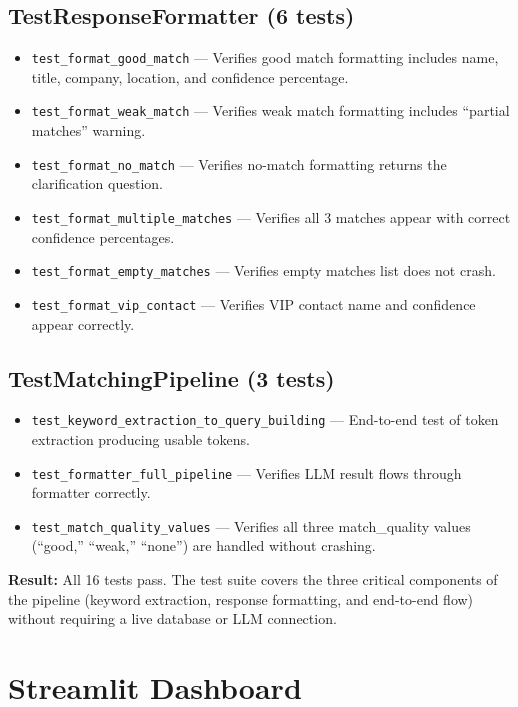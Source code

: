 \documentclass[12pt, a4paper]{report}
\begin{document}
\subsection{TestResponseFormatter (6 tests)}

\begin{itemize}[itemsep=2pt]
    \item \texttt{test\_format\_good\_match} --- Verifies good match formatting includes name, title, company, location, and confidence percentage.
    \item \texttt{test\_format\_weak\_match} --- Verifies weak match formatting includes ``partial matches'' warning.
    \item \texttt{test\_format\_no\_match} --- Verifies no-match formatting returns the clarification question.
    \item \texttt{test\_format\_multiple\_matches} --- Verifies all 3 matches appear with correct confidence percentages.
    \item \texttt{test\_format\_empty\_matches} --- Verifies empty matches list does not crash.
    \item \texttt{test\_format\_vip\_contact} --- Verifies VIP contact name and confidence appear correctly.
\end{itemize}

\subsection{TestMatchingPipeline (3 tests)}

\begin{itemize}[itemsep=2pt]
    \item \texttt{test\_keyword\_extraction\_to\_query\_building} --- End-to-end test of token extraction producing usable tokens.
    \item \texttt{test\_formatter\_full\_pipeline} --- Verifies LLM result flows through formatter correctly.
    \item \texttt{test\_match\_quality\_values} --- Verifies all three match\_quality values (``good,'' ``weak,'' ``none'') are handled without crashing.
\end{itemize}

\textbf{Result:} All 16 tests pass. The test suite covers the three critical components of the pipeline (keyword extraction, response formatting, and end-to-end flow) without requiring a live database or LLM connection.

\section{Streamlit Dashboard}
\end{document}

